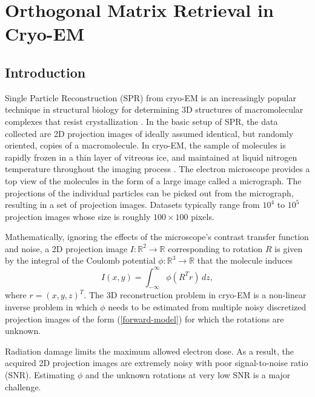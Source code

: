 
\chapter{Orthogonal Matrix Retrieval in Cryo-EM}


\section{Introduction}
\label{sec:intro}

Single Particle Reconstruction (SPR) from cryo-EM is an increasingly popular technique in structural biology for
determining 3D structures of macromolecular complexes that resist crystallization \cite{Frank1,Kuhlbrandt1443,cryoem_rev}.
In the basic setup of SPR, the data collected are 2D projection images of ideally assumed identical, but randomly oriented, copies of a macromolecule. In cryo-EM, the sample of molecules is rapidly frozen in a thin layer of vitreous ice, and maintained at liquid nitrogen temperature throughout the imaging process \cite{wang06}. The electron microscope provides a top view of the molecules in the form of a large image called a micrograph. The projections of the individual particles can be picked out from the micrograph, resulting in a set of projection images. Datasets typically range from $10^4$ to $10^5$ projection images whose size is roughly $100 \times 100$ pixels.

Mathematically, ignoring the effects of the microscope's contrast transfer function and noise, a 2D projection image $I:\mathbb{R}^2\to \mathbb{R}$ corresponding to rotation $R$ is given by the integral of the Coulomb potential $\phi : \mathbb{R}^3 \to \mathbb{R}$ that the molecule induces
\begin{equation}
\label{forward-model}
I(x,y) = \int_{-\infty}^\infty \phi(R^T r)\,dz,
\end{equation}
where $r = (x, y, z)^T$. The 3D reconstruction problem in cryo-EM is a non-linear inverse problem in which $\phi$ needs to be estimated from multiple noisy discretized projection images of the form (\ref{forward-model}) for which the rotations are unknown.

Radiation damage limits the maximum allowed electron dose. As a result, the acquired 2D projection images are extremely noisy with poor signal-to-noise ratio (SNR). Estimating $\phi$ and the unknown rotations at very low SNR is a major challenge.


